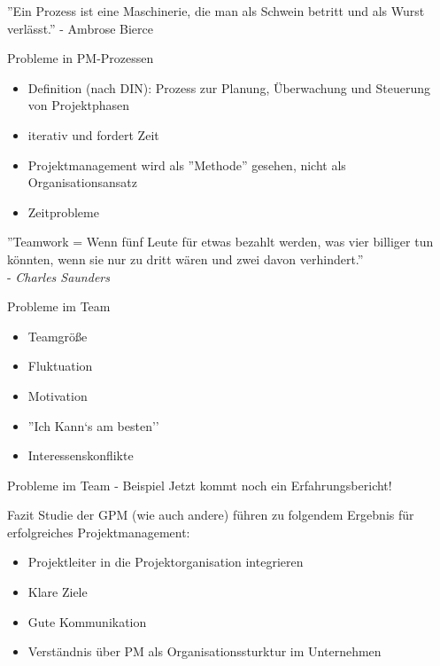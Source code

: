 \documentclass[12pt]{beamer}
\begin{document}
	\thispagestyle{empty}
	\begin{frame}
		
		''Ein Prozess ist eine Maschinerie, die man als Schwein betritt und als Wurst verlässt.''  - Ambrose Bierce
		
	\end{frame}
	
	\begin{frame}{Probleme in PM-Prozessen}
		\begin{itemize}
			\item{Definition (nach DIN): Prozess zur Planung, Überwachung und Steuerung von Projektphasen}
			\item{iterativ und fordert Zeit}
			\item{Projektmanagement wird als ''Methode'' gesehen, nicht als Organisationsansatz}
			\item{Zeitprobleme}
		\end{itemize}
	
	\end{frame}
	
	\thispagestyle{empty}
	\begin{frame}
		''Teamwork = Wenn fünf Leute für etwas bezahlt werden, was vier billiger tun könnten, wenn sie nur zu dritt wären und zwei davon verhindert.''\\
- \textit{Charles Saunders}
	\end{frame}

	
	\begin{frame}{Probleme im Team}
		\begin{itemize}
			\item{Teamgröße}
			\item{Fluktuation}
			\item{Motivation}
			\item{''Ich Kann`s am besten''}
			\item{Interessenskonflikte}
		\end{itemize}
	\end{frame}

	\begin{frame}{Probleme im Team - Beispiel}
		Jetzt kommt noch ein Erfahrungsbericht!	
	\end{frame}

	\begin{frame}{Fazit}
		Studie der GPM (wie auch andere) führen zu folgendem Ergebnis für erfolgreiches Projektmanagement:
		\begin{itemize}
			\item{Projektleiter in die Projektorganisation integrieren}
			\item{Klare Ziele}
			\item{Gute Kommunikation}
			\item{Verständnis über PM als Organisationssturktur im Unternehmen}
		\end{itemize}
	\end{frame}
	
\end{document}
